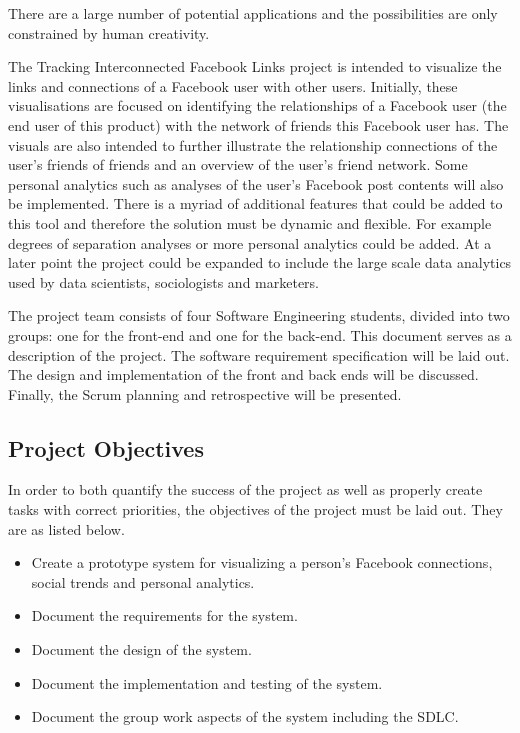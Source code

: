 \documentclass[12pt,onecolumn]{article}
\begin{document}
	There are a large number of potential applications and the possibilities are only constrained by human creativity.
	
	The Tracking Interconnected Facebook Links project is intended to visualize the links and connections of a Facebook user with other users. Initially, these visualisations are focused on identifying the relationships of a Facebook user (the end user of this product) with the network of friends this Facebook user has. The visuals are also intended to further illustrate the relationship connections of the user's friends of friends and an overview of the user's friend network. Some personal analytics such as analyses of the user's Facebook post contents will also be implemented. There is a myriad of additional features that could be added to this tool and therefore the solution must be dynamic and flexible. For example degrees of separation analyses or more personal analytics could be added. At a later point the project could be expanded to include the large scale data analytics used by data scientists, sociologists and marketers. 
	
	The project team consists of four Software Engineering students, divided into two groups: one for the front-end and one for the back-end. This document serves as a description of the project. The software requirement specification will be laid out. The design and implementation of the front and back ends will be discussed. Finally, the Scrum planning and retrospective will be presented.
	
	\subsection{Project Objectives} %
	
	In order to both quantify the success of the project as well as properly create tasks with correct priorities, the objectives of the project must be laid out. They are as listed below.
	
	\begin{itemize}
		
		\item Create a prototype system for visualizing a person's Facebook connections, social trends and personal analytics.
		
		\item Document the requirements for the system.
		
		\item Document the design of the system.
		
		\item Document the implementation and testing of the system.
		
		\item Document the group work aspects of the system including the SDLC.
		
	\end{itemize}
	
\end{document}
